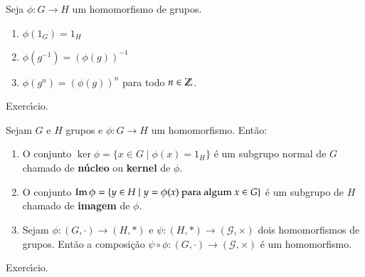 \begin{lema}
	Seja $\phi : G \to H$ um homomorfismo de grupos.
	\begin{enumerate}[label=({\roman*})]
		\item $\phi(1_G) = 1_H$
		\item $\phi(g^{-1}) = (\phi(g))^{-1}$
		\item $\phi(g^n) = (\phi(g))^n$ para todo $n \in \mathbb{Z}$.
	\end{enumerate}
\end{lema}
\begin{prova}
	Exerc{\'\i}cio.
\end{prova}

\begin{lema}
	Sejam $G$ e $H$ grupos e $\phi : G \to H$ um homomorfismo. Ent\~ao:
	\begin{enumerate}
		\item O conjunto $\ker\phi = \{x \in G \mid \phi(x) = 1_H\}$ \'e um subgrupo normal de $G$ chamado de \textbf{n\'ucleo} ou \textbf{kernel} de $\phi$.
		\item O conjunto ${\rm Im\,}\phi = \{y \in H \mid y = \phi(x) \mbox{ para algum } x \in G\}$ \'e um subgrupo de $H$ chamado de \textbf{imagem} de $\phi.$
		\item Sejam $\phi : (G, \cdot) \to (H, *)$ e $\psi : (H,*) \to (\mathcal{G},\times)$ dois homomorfismos de grupos. Ent\~ao a composi\c{c}\~ao $\psi\circ\phi : (G, \cdot) \to (\mathcal{G}, \times)$ \'e um homomorfismo.
	\end{enumerate}
\end{lema}
\begin{prova}
	Exerc{\'\i}cio.
\end{prova}

